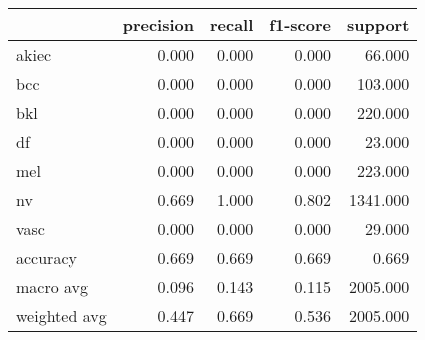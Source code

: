 \begin{tabular}{lrrrr}
\toprule
 & precision & recall & f1-score & support \\
\midrule
akiec & 0.000 & 0.000 & 0.000 & 66.000 \\
bcc & 0.000 & 0.000 & 0.000 & 103.000 \\
bkl & 0.000 & 0.000 & 0.000 & 220.000 \\
df & 0.000 & 0.000 & 0.000 & 23.000 \\
mel & 0.000 & 0.000 & 0.000 & 223.000 \\
nv & 0.669 & 1.000 & 0.802 & 1341.000 \\
vasc & 0.000 & 0.000 & 0.000 & 29.000 \\
accuracy & 0.669 & 0.669 & 0.669 & 0.669 \\
macro avg & 0.096 & 0.143 & 0.115 & 2005.000 \\
weighted avg & 0.447 & 0.669 & 0.536 & 2005.000 \\
\bottomrule
\end{tabular}
